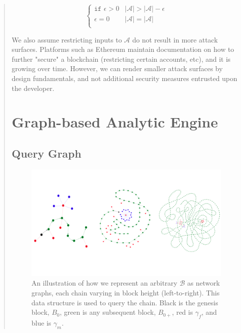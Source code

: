 \documentclass[12pt, titlepage, twocolumn]{report}
\begin{document}
\begin{quotation}
\begin{equation}
	\begin{cases} 
      	\texttt{if } \epsilon > 0 &  \vert\mathcal{A}\vert > \vert\mathcal{A}\vert - \epsilon \\
      	\epsilon = 0   &  \vert\mathcal{A}\vert = \vert\mathcal{A}\vert \\
   	\end{cases}
\end{equation}

We also assume restricting inputs to \(\mathcal{A}\) do not result in more attack surfaces. Platforms such as Ethereum maintain documentation on how to further "secure" a blockchain (restricting certain accounts, etc), and it is growing over time. However, we can render smaller attack surfaces by design fundamentals, and not additional security measures entrusted upon the developer.

\chapter{Graph-based Analytic Engine}

\section{Query Graph}


\begin{figure}[ht]
\centering
	\includegraphics[width=\textwidth]{3_networks}
	\caption{An illustration of how we represent an arbitrary \( \boldsymbol{\mathcal{B}} \) as network graphs, each chain varying in block height (left-to-right). This data structure is used to query the chain. Black is the genesis block, \(B_0\), green is any subsequent block, \(B_{0+}\), red is \(\gamma_f\), and blue is \(\gamma_m\). }
	\label{3_networks}
\end{figure}


\end{quotation}
\end{document}
